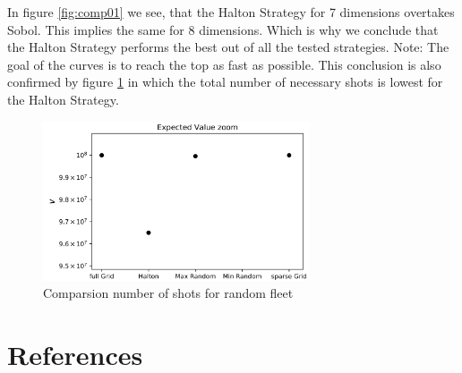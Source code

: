 \documentclass[final,hyperref={pdfpagelabels=false},table]{beamer}
\begin{document}
\begin{frame}
\begin{columns}[T]
\begin{column}{\colCWidth}
In figure \ref{fig:comp01} we see, that the Halton Strategy for 7 dimensions overtakes Sobol. This implies the same for 8 dimensions. Which is why we conclude that the Halton Strategy performs the best out of all the tested strategies. Note: The goal of the curves is to reach the top as fast as possible.
This conclusion is also confirmed by figure \ref{fig:comp02} in which the total number of necessary shots is lowest for the Halton Strategy.

\begin{figure}[h]
	\centering
	\includegraphics[width=0.7\textwidth]{../gfx/Compare02.png}
	\caption{Comparsion number of shots for random fleet}
	\label{fig:comp02}
\end{figure}



\section{References}
\normalem %




\end{column}
\end{columns}

\end{frame}
\end{document}
